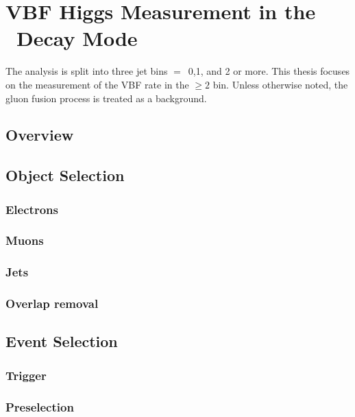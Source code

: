 \chapter{VBF Higgs Measurement in the \wwlnln~Decay Mode}
\label{chap:analysis}

The \hwwlnln analysis is split into three jet bins \Njet$=$~0,1, and 2
or more. This thesis focuses on the measurement of the VBF rate in the
\Njet$\geq{2}$ bin. Unless otherwise noted, the gluon fusion \hww
process is treated as a background. 

\section{Overview}

\section{Object Selection}
\subsection{Electrons}

\subsection{Muons}

\subsection{Jets}

\subsection{Overlap removal}

\subsection{\etmiss}

\section{Event Selection}

\subsection{Trigger}

\subsection{Preselection}


